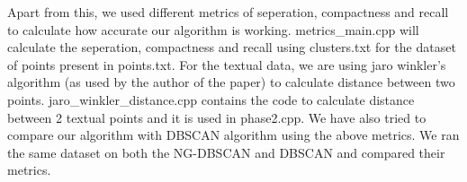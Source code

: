 \documentclass[acmsmall]{acmart}
\begin{document}
Apart from this, we used different metrics of seperation, compactness and recall to calculate how accurate our algorithm is working. metrics\_main.cpp will calculate the seperation, compactness and recall using clusters.txt for the dataset of points present in points.txt. 
\newline \newline
For the textual data, we are using jaro winkler's algorithm (as used by the author of the paper) to calculate distance between two points. jaro\_winkler\_distance.cpp contains the code to calculate distance between 2 textual points and it is used in phase2.cpp. \newline
We have also tried to compare our algorithm with DBSCAN algorithm using the above metrics. We ran the same dataset on both the NG-DBSCAN and DBSCAN and compared their metrics.
\end{document}

